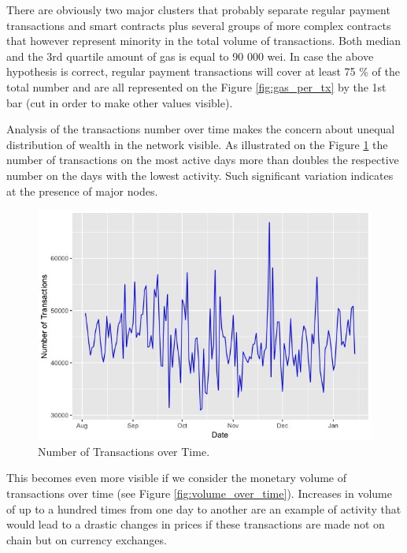 There are obviously two major clusters that probably separate regular payment transactions and smart contracts plus several groups of more complex contracts that however represent minority in the total volume of transactions. 
Both median and the 3rd quartile amount of gas is equal to 90 000 wei. In case the above hypothesis is correct, regular payment transactions will cover at least 75 \% of the total number and are all represented on the Figure \ref{fig:gas_per_tx} by the 1st bar (cut in order to make other values visible).

Analysis of the transactions number over time makes the concern about unequal distribution of wealth in the network visible. 
As illustrated on the Figure \ref{fig:tx_over_time} the number of transactions on the most active days more than doubles the respective number on the days with the lowest activity. 
Such significant variation indicates at the presence of major nodes.  

\begin{figure}[ht]
  \centering
  \includegraphics[width=\linewidth]{figures/tx_over_time.jpeg}
  \caption{Number of Transactions over Time.}
  \label{fig:tx_over_time}
\end{figure}

This becomes even more visible if we consider the monetary volume of transactions over time (see Figure \ref{fig:volume_over_time}).
Increases in volume of up to a hundred times from one day to another are an example of activity that would lead to a drastic changes in prices if these transactions are made not on chain but on currency exchanges.

